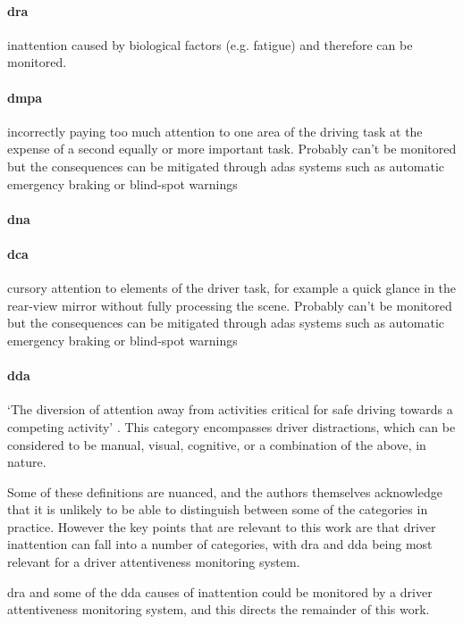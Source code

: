\documentclass[11pt, parskip=half*,twoside=false]{scrbook}
\begin{document}
\paragraph{\gls{dra}} inattention caused by biological factors (e.g. fatigue) and therefore can be monitored.

\paragraph{\gls{dmpa}} incorrectly paying too much attention to one area of the driving task at the expense of a second equally or more important task. Probably can't be monitored but the consequences can be mitigated through \gls{adas} systems such as automatic emergency braking or blind-spot warnings

\paragraph{\gls{dna}}  

\paragraph{\gls{dca}} cursory attention to elements of the driver task, for example a quick glance in the rear-view mirror without fully processing the scene. Probably can't be monitored but the consequences can be mitigated through \gls{adas} systems such as automatic emergency braking or blind-spot warnings

\paragraph{\gls{dda}} `The diversion of attention away from activities critical for safe driving towards a competing activity' \citep{reganDriverDistractionDriver2011}. This category encompasses driver distractions, which can be considered to be manual, visual, cognitive, or a combination of the above, in nature.

Some of these definitions are nuanced, and the authors themselves acknowledge that it is unlikely to be able to distinguish between some of the categories in practice. However the key points that are relevant to this work are that driver inattention can fall into a number of categories, with \gls{dra} and \gls{dda} being most relevant for a driver attentiveness monitoring system.

\gls{dra} and some of the \gls{dda} causes of inattention could be monitored by a driver attentiveness monitoring system, and this directs the remainder of this work.  
\end{document}
